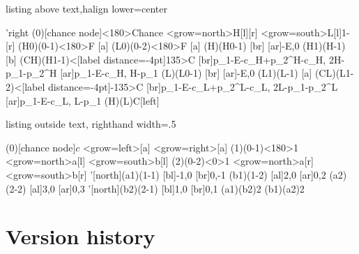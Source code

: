 \begin{tcblisting}{listing above text,halign lower=center}
\begin{istgame}
\setistgrowdirection'{right}
\xtdistance{20mm}{20mm}
\istroot(0)[chance node]<180>{Chance}
  \istB<grow=north>{H}[l]{\pi}[r]  \istB<grow=south>{L}[l]{1-\pi}[r]  \endist
\istroot(H0)(0-1)<180>{F}
  [a]  \endist
\istroot(L0)(0-2)<180>{F}
  [a]  \endist
{}
\cntmdistance*{10mm}{20mm}{8mm}
\istroot(H)(H0-1)
  [br]  [ar]{-E,0}  \endist
\istrootcntm(H1)(H-1)
  [b]  \istbm  \endist
\istroot(CH)(H1-1)<[label distance=-4pt]135>{C}
  [br]{p_1-E-c_H+p_2^H-c_H, 2H-p_1-p_2^H}
  [ar]{p_1-E-c_H, H-p_1}
  \endist
\istroot(L)(L0-1)
  [br]  [ar]{-E,0}  \endist
\istrootcntm(L1)(L-1)
  \istbm  {}[a]  \endist
\istroot(CL)(L1-2)<[label distance=-4pt]-135>{C}
  [br]{p_1-E-c_L+p_2^L-c_L, 2L-p_1-p_2^L}
  [ar]{p_1-E-c_L, L-p_1}
  \endist
\xtInfoset(H)(L){C}[left]
\end{istgame}
\end{tcblisting}


\begin{tcblisting}{listing outside text, righthand width=.5\linewidth}
\begin{istgame}[scale=1.3]
\xtdistance{20mm}{20mm}
\istroot(0)[chance node]{$c$}
  \istb<grow=left>{}[a]
  \istb<grow=right>{}[a]
  \endist
\xtdistance{10mm}{20mm}
\istroot(1)(0-1)<180>{1}
  \istb<grow=north>{a}[l]
  \istb<grow=south>{b}[l]
  \endist
\istroot(2)(0-2)<0>{1}
  \istb<grow=north>{a}[r]
  \istb<grow=south>{b}[r]
  \endist
\istroot'[north](a1)(1-1)
  [bl]{-1,0}
  [br]{0,-1}
  \endist
\istroot(b1)(1-2)
  [al]{2,0}
  [ar]{0,2}
  \endist
\istroot(a2)(2-2)
  [al]{3,0}
  [ar]{0,3}
  \endist
\istroot'[north](b2)(2-1)
  [bl]{1,0}
  [br]{0,1}
  \endist
\xtInfoset(a1)(b2){2}
\xtInfoset(b1)(a2){2}
\end{istgame}
\end{tcblisting}


{}
\section{Version history}

